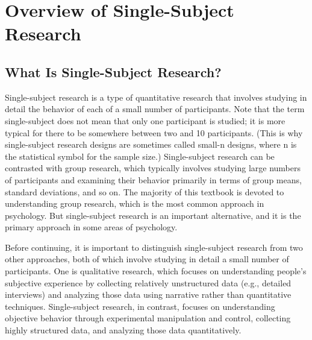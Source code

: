 \section{Overview of Single-Subject Research}


\subsection{What Is Single-Subject Research?}

Single-subject research is a type of quantitative research that involves studying in detail the behavior of each of a small number of participants. Note that the term single-subject does not mean that only one participant is studied; it is more typical for there to be somewhere between two and 10 participants. (This is why single-subject research designs are sometimes called small-n designs, where n is the statistical symbol for the sample size.) Single-subject research can be contrasted with group research, which typically involves studying large numbers of participants and examining their behavior primarily in terms of group means, standard deviations, and so on. The majority of this textbook is devoted to understanding group research, which is the most common approach in psychology. But single-subject research is an important alternative, and it is the primary approach in some areas of psychology.

Before continuing, it is important to distinguish single-subject research from two other approaches, both of which involve studying in detail a small number of participants. One is qualitative research, which focuses on understanding people's subjective experience by collecting relatively unstructured data (e.g., detailed interviews) and analyzing those data using narrative rather than quantitative techniques. Single-subject research, in contrast, focuses on understanding objective behavior through experimental manipulation and control, collecting highly structured data, and analyzing those data quantitatively.

